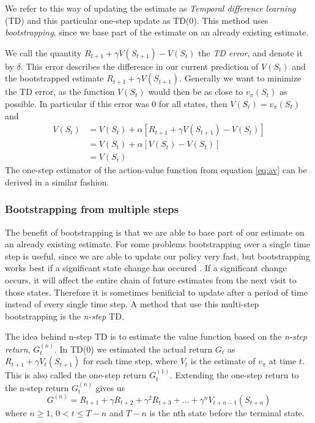 \documentclass[11pt]{article}
\begin{document}
We refer to this way of updating the estimate as
\textit{Temporal difference learning} (TD) and this particular one-step
update as TD($0$)\cite{RLbook}.
This method uses \textit{bootstrapping}, since we base
part of the estimate on an already existing estimate.

We call the quantity $R_{t+1} + \gamma  V(S_{t+1}) - V(S_t)$
the \textit{TD error}, and denote it by $\delta$.
This error describes the difference in our current prediction of 
$V(S_t)$ and the bootstrapped estimate $R_{t+1} + \gamma 
V(S_{t+1})$.
Generally we want to minimize the TD error, as the function $V(S_t)$
would then be as close to $v_\pi(S_t)$ as possible.
In particular if this error was 0 for all states, then
$V(S_t) = v_\pi(S_t)$ and
\begin{align}
   V(S_t)  & = V(S_t) + \alpha  [R_{t+1} + \gamma  V(S_{t+1}) - V(S_t)]   \\
           & = V(S_t) + \alpha  [V(S_t) - V(S_t)]  \\
           & = V(S_t) 
\end{align}
The one-step estimator of the action-value function from equation
\ref{eq:av} can be derived in a similar fashion.

\subsubsection{Bootstrapping from multiple steps}

The benefit of bootstrapping is that we are able to base part of our estimate on
an already existing estimate.
For some problems bootstrapping over a single time step is useful, since
we are able to update our policy very fast,
but bootstrapping works best if a significant state change has occured
\cite{RLbook}.
If a significant change occurs, it will affect the entire chain
of future estimates from the next visit to those states.
Therefore it is sometimes benificial to update after a period of time
instead of every single time step.
A method that use this multi-step bootstrapping is the \textit{n-step}
TD.

The idea behind n-step TD is to estimate the value function
based on the \textit{n-step return}, $G^{(n)}_t$.
In TD($0$) we estimated the actual return $G_t$ as
$R_{t+1} + \gamma  V_t(S_{t+1})$ for each time step,
where $V_t$ is the estimate of $v_\pi$ at time $t$.
This is also called the one-step return $G^{(1)}_t$.
Extending the one-step return to the n-step return $G^{(n)}_t$ gives us
\begin{equation}
        G^{(n)} = R_{t+1} + \gamma  R_{t+2} + \gamma^2  R_{t+3} + \dots + \gamma^n  V_{t+n-1}(S_{t+n})
\end{equation}
where $n \geq 1$, $0 < t \leq T - n$ and $T - n$ is the nth state before the terminal
state\cite{RLbook}.
\end{document}
